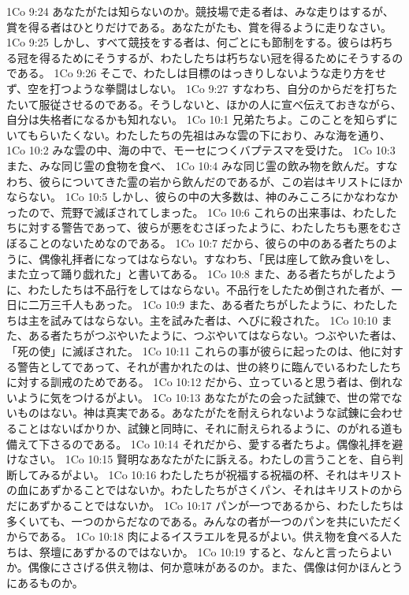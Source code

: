 1Co 9:24  あなたがたは知らないのか。競技場で走る者は、みな走りはするが、賞を得る者はひとりだけである。あなたがたも、賞を得るように走りなさい。
1Co 9:25  しかし、すべて競技をする者は、何ごとにも節制をする。彼らは朽ちる冠を得るためにそうするが、わたしたちは朽ちない冠を得るためにそうするのである。
1Co 9:26  そこで、わたしは目標のはっきりしないような走り方をせず、空を打つような拳闘はしない。
1Co 9:27  すなわち、自分のからだを打ちたたいて服従させるのである。そうしないと、ほかの人に宣べ伝えておきながら、自分は失格者になるかも知れない。
1Co 10:1  兄弟たちよ。このことを知らずにいてもらいたくない。わたしたちの先祖はみな雲の下におり、みな海を通り、
1Co 10:2  みな雲の中、海の中で、モーセにつくバプテスマを受けた。
1Co 10:3  また、みな同じ霊の食物を食べ、
1Co 10:4  みな同じ霊の飲み物を飲んだ。すなわち、彼らについてきた霊の岩から飲んだのであるが、この岩はキリストにほかならない。
1Co 10:5  しかし、彼らの中の大多数は、神のみこころにかなわなかったので、荒野で滅ぼされてしまった。
1Co 10:6  これらの出来事は、わたしたちに対する警告であって、彼らが悪をむさぼったように、わたしたちも悪をむさぼることのないためなのである。
1Co 10:7  だから、彼らの中のある者たちのように、偶像礼拝者になってはならない。すなわち、「民は座して飲み食いをし、また立って踊り戯れた」と書いてある。
1Co 10:8  また、ある者たちがしたように、わたしたちは不品行をしてはならない。不品行をしたため倒された者が、一日に二万三千人もあった。
1Co 10:9  また、ある者たちがしたように、わたしたちは主を試みてはならない。主を試みた者は、へびに殺された。
1Co 10:10  また、ある者たちがつぶやいたように、つぶやいてはならない。つぶやいた者は、「死の使」に滅ぼされた。
1Co 10:11  これらの事が彼らに起ったのは、他に対する警告としてであって、それが書かれたのは、世の終りに臨んでいるわたしたちに対する訓戒のためである。
1Co 10:12  だから、立っていると思う者は、倒れないように気をつけるがよい。
1Co 10:13  あなたがたの会った試錬で、世の常でないものはない。神は真実である。あなたがたを耐えられないような試錬に会わせることはないばかりか、試錬と同時に、それに耐えられるように、のがれる道も備えて下さるのである。
1Co 10:14  それだから、愛する者たちよ。偶像礼拝を避けなさい。
1Co 10:15  賢明なあなたがたに訴える。わたしの言うことを、自ら判断してみるがよい。
1Co 10:16  わたしたちが祝福する祝福の杯、それはキリストの血にあずかることではないか。わたしたちがさくパン、それはキリストのからだにあずかることではないか。
1Co 10:17  パンが一つであるから、わたしたちは多くいても、一つのからだなのである。みんなの者が一つのパンを共にいただくからである。
1Co 10:18  肉によるイスラエルを見るがよい。供え物を食べる人たちは、祭壇にあずかるのではないか。
1Co 10:19  すると、なんと言ったらよいか。偶像にささげる供え物は、何か意味があるのか。また、偶像は何かほんとうにあるものか。
